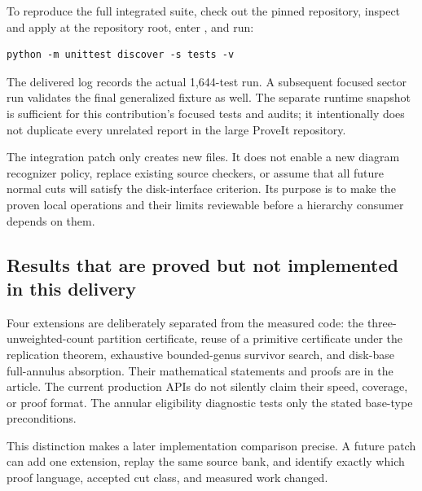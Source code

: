 To reproduce the full integrated suite, check out the pinned repository,
inspect and apply  at the repository root, enter
, and run:
\begin{lstlisting}
python -m unittest discover -s tests -v
\end{lstlisting}
The delivered log records the actual 1,644-test run.  A subsequent focused
sector run validates the final generalized fixture as well.  The separate
runtime snapshot is sufficient for this contribution's focused tests and
audits; it intentionally does not duplicate every unrelated report in the
large ProveIt repository.

The integration patch only creates new files.  It does not enable a new
diagram recognizer policy, replace existing source checkers, or assume that
all future normal cuts will satisfy the disk-interface criterion.  Its
purpose is to make the proven local operations and their limits reviewable
before a hierarchy consumer depends on them.

\subsection{Results that are proved but not implemented in this delivery}

Four extensions are deliberately separated from the measured code:
the three-unweighted-count partition certificate, reuse of a primitive
certificate under the replication theorem, exhaustive bounded-genus survivor
search, and disk-base full-annulus absorption.  Their mathematical statements
and proofs are in the article.  The current production APIs do not silently
claim their speed, coverage, or proof format.  The annular eligibility
diagnostic tests only the stated base-type preconditions.

This distinction makes a later implementation comparison precise.  A future
patch can add one extension, replay the same source bank, and identify exactly
which proof language, accepted cut class, and measured work changed.
